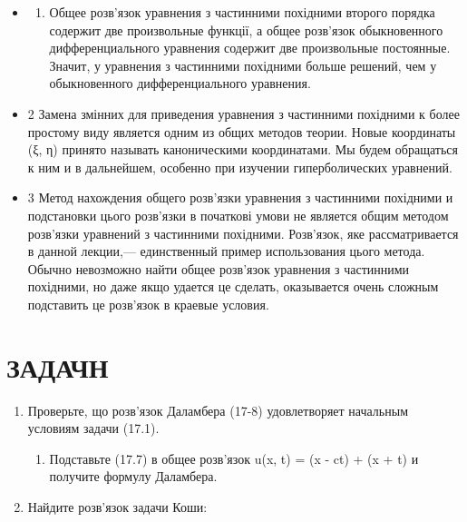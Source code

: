 \documentclass[
  ukrainian,
]{article}
\providecommand{\tightlist}{%
  \setlength{\itemsep}{0pt}\setlength{\parskip}{0pt}}
\begin{document}
\begin{itemize}
\item
  \begin{enumerate}
  \def\labelenumi{\arabic{enumi}.}
  \tightlist
  \item
    Общее розв'язок уравнения з частинними похідними второго порядка
    содержит две произвольные функції, а общее розв'язок обыкновенного
    дифференциального уравнения содержит две произвольные постоянные.
    Значит, у уравнения з частинними похідними больше решений, чем у
    обыкновенного дифференциального уравнения.
  \end{enumerate}
\item
  2 Замена змінних для приведения уравнения з частинними похідними к
  более простому виду является одним из общих методов теории. Новые
  координаты (ξ, η) принято называть каноническими координатами. Мы
  будем обращаться к ним и в дальнейшем, особенно при изучении
  гиперболических уравнений.
\item
  3 Метод нахождения общего розв'язки уравнения з частинними похідними и
  подстановки цього розв'язки в початкові умови не является общим
  методом розв'язки уравнений з частинними похідними. Розв'язок, яке
  рассматривается в данной лекции,--- единственный пример использования
  цього метода. Обычно невозможно найти общее розв'язок уравнения з
  частинними похідними, но даже якщо удается це сделать, оказывается
  очень сложным подставить це розв'язок в краевые условия.
\end{itemize}

\section{ЗАДАЧН}\label{ux437ux430ux434ux430ux447ux43d}

\begin{enumerate}
\def\labelenumi{\arabic{enumi}.}
\item
  Проверьте, що розв'язок Даламбера (17-8) удовлетворяет начальным
  условиям задачи (17.1).

  \begin{enumerate}
  \def\labelenumii{\arabic{enumii}.}
  \setcounter{enumii}{1}
  \tightlist
  \item
    Подставьте (17.7) в общее розв'язок u(x, t) = \psi(x - ct) + \psi(x
    + \epsilon t) и получите формулу Даламбера.
  \end{enumerate}
\item
  Найдите розв'язок задачи Коши:
\end{enumerate}
\end{document}
